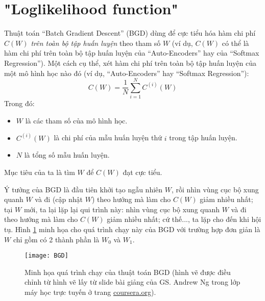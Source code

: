 \section{"Loglikelihood function"}

Thuật toán ``Batch Gradient Descent'' (BGD) dùng để cực tiểu hóa hàm chi phí $C(W)$ \emph{trên toàn bộ tập huấn luyện} theo tham số $W$ (ví dụ, $C(W)$ có thể là hàm chi phí trên toàn bộ tập huấn luyện của ``Auto-Encoders'' hay của ``Softmax Regression''). Một cách cụ thể, xét hàm chi phí trên toàn bộ tập huấn luyện của một mô hình học nào đó (ví dụ, ``Auto-Encoders'' hay ``Softmax Regression''):
\begin{equation}
	C(W) = \frac{1}{N} \sum_{i=1}^N C^{(i)}(W)
	\label{eq_CostFunct}
\end{equation}
Trong đó:
\begin{itemize}
	\item $W$ là các tham số của mô hình học.
	\item $C^{(i)}(W)$ là chi phí của mẫu huấn luyện thứ $i$ trong tập huấn luyện.
	\item $N$ là tổng số mẫu huấn luyện.
\end{itemize}
Mục tiêu của ta là tìm $W$ để $C(W)$ đạt cực tiểu.

Ý tưởng của BGD là đầu tiên khởi tạo ngẫu nhiên $W$, rồi nhìn vùng cục bộ xung quanh $W$ và đi (cập nhật $W$) theo hướng mà làm cho $C(W)$ giảm nhiều nhất; tại $W$ mới, ta lại lặp lại qui trình này: nhìn vùng cục bộ xung quanh $W$ và đi theo hướng mà làm cho $C(W)$ giảm nhiều nhất; cứ thế..., ta lặp cho đến khi hội tụ. Hình \ref{fig_BGD} minh họa cho quá trình chạy này của BGD với trường hợp đơn giản là $W$ chỉ gồm có 2 thành phần là $W_0$ và $W_1$.
\begin{figure}
	\centering
	\texttt{[image: BGD]}
	\caption[Minh họa quá trình chạy của thuật toán BGD]{Minh họa quá trình chạy của thuật toán BGD (hình vẽ được điều chỉnh từ hình vẽ lấy từ slide bài giảng của GS. Andrew Ng trong lớp máy học trực tuyến ở trang \url{coursera.org}).}
	\label{fig_BGD}
\end{figure}


